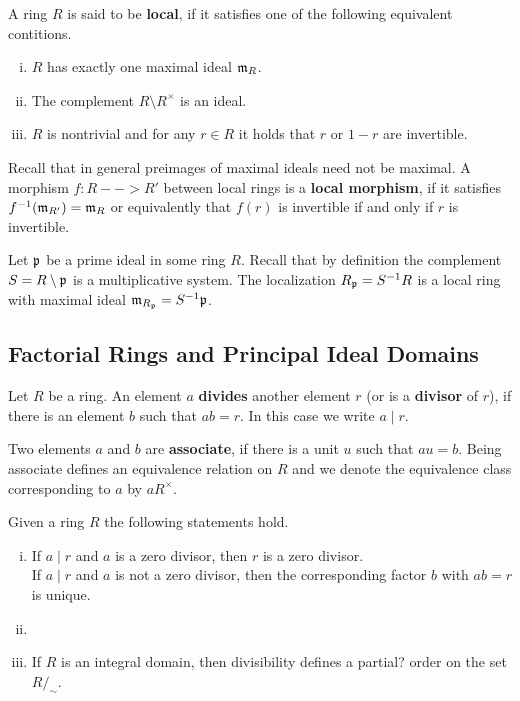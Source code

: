 	\begin{definition}
		A ring $R$ is said to be \textbf{local}, if it satisfies one of the following equivalent contitions.
		\begin{enumerate}[(i)]
			\item{
				$R$ has exactly one maximal ideal $\mathfrak{m}_R$.
			}
			\item{
				The complement $R \setminus R^\times$ is an ideal.
			}
			\item{
				$R$ is nontrivial and for any $r \in R$ it holds that $r$ or $1-r$ are invertible.
			}
		\end{enumerate}

		Recall that in general preimages of maximal ideals need not be maximal. A morphism $f:R-->R'$ between local rings is a \textbf{local morphism}, if it satisfies $f^{-1}(\mathfrak{m}_{R'}) = \mathfrak{m}_R$ or equivalently that $f(r)$ is invertible if and only if $r$ is invertible.
	\end{definition}

	\begin{corollary}
		Let $\mathfrak{p}$ be a prime ideal in some ring $R$. Recall that by definition the complement $S = R\setminus \mathfrak{p}$ is a multiplicative system. The localization $R_{\mathfrak{p}} = S^{-1}R$ is a local ring with maximal ideal $\mathfrak{m}_{R_{\mathfrak{p}}} = S^{-1}\mathfrak{p}$.
	\end{corollary}

	\newpage
	\subsection{Factorial Rings and Principal Ideal Domains}

	\begin{definition}
		Let $R$ be a ring. An element $a$ \textbf{divides} another element $r$ (or is a \textbf{divisor} of $r$), if there is an element $b$ such that $ab = r$. In this case we write $a \mid r$.

		Two elements $a$ and $b$ are \textbf{associate}, if there is a unit $u$ such that $au = b$. Being associate defines an equivalence relation on $R$ and we denote the equivalence class corresponding to $a$ by $aR^\times$. 
	\end{definition}

	\begin{lemma}
		Given a ring $R$ the following statements hold.
		\begin{enumerate}[(i)]
			\item{
				If $a \mid r$ and $a$ is a zero divisor, then $r$ is a zero divisor.\\
				If $a \mid r$ and $a$ is not a zero divisor, then the corresponding factor $b$ with $ab = r$ is unique.
			}
			\item{
			}
			\item{
				If $R$ is an integral domain, then divisibility defines a partial? order on the set $R/_\sim$.
			}
		\end{enumerate}
	\end{lemma}

